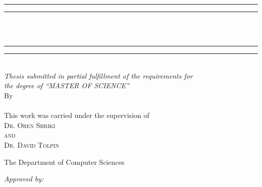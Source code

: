\begin{center}
\vspace*{3mm}
\rule[0.5ex]{\linewidth}{2pt}\vspace*{-\baselineskip}\vspace*{3.2pt}
\rule[0.5ex]{\linewidth}{1pt}\\
[\baselineskip]{\Huge \thesisTitle}\\[3mm]
\rule[0.5ex]{\linewidth}{1pt}\vspace*{-\baselineskip}\vspace{3.2pt}
\rule[0.5ex]{\linewidth}{3pt}\\
\vspace*{5mm}
{\large \textit{Thesis submitted in partial fulfillment of the requirements for \\ [2mm]
the degree of \enquote{MASTER OF SCIENCE}
}}\\
\vspace{6.5mm}
{\large By}\\
\vspace{2.5mm}
{\large\textsc{\thesisAuthor}}\\
\vspace{6.5mm}
{\large This work was carried under the supervision of}\\
\vspace{2.5mm}
{\large\textsc{Dr. Oren Shriki}}\\
\vspace{2.5mm}
{\large\textsc{and}}\\
\vspace{2.5mm}
{\large\textsc{Dr. David Tolpin}}\\
\vspace{6.5mm}

{\large The Department of Computer Sciences
}\\
\vspace{8mm}

\begin{minipage}{10cm}
\textit{Approved by:}
\vspace{1em}
\begin{center}


\end{center}
\end{minipage}
\end{center}
